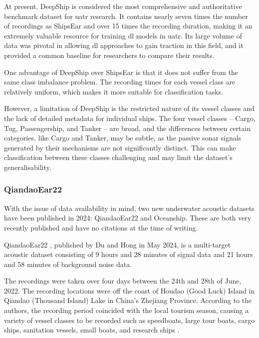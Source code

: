 At present, DeepShip is considered the most comprehensive and authoritative benchmark dataset for \acrshort{uatr} research. It contains nearly seven times the number of recordings as ShipsEar and over 15 times the recording duration, making it an extremely valuable resource for training \acrlong{dl} models in \acrshort{uatr}. Its large volume of data was pivotal in allowing \acrlong{dl} approaches to gain traction in this field, and it provided a common baseline for researchers to compare their results.

One advantage of DeepShip over ShipsEar is that it does not suffer from the same class imbalance problem. The recording times for each vessel class are relatively uniform, which makes it more suitable for classification tasks.

However, a limitation of DeepShip is the restricted nature of its vessel classes and the lack of detailed metadata for individual ships. The four vessel classes -- Cargo, Tug, Passengership, and Tanker -- are broad, and the differences between certain categories, like Cargo and Tanker, may be subtle, as the passive sonar signals generated by their mechanisms are not significantly distinct. This can make classification between these classes challenging and may limit the dataset's generalisability.

\subsubsection{QiandaoEar22}\label{subsubsec:qiandaoear22}

With the issue of data availability in mind, two new underwater acoustic datasets have been published in 2024: QiandaoEar22 and Oceanship. These are both very recently published and have no citations at the time of writing.

QiandaoEar22 \cite{du_qiandaoear22_2024}, published by Du and Hong in May 2024, is a multi-target acoustic dataset consisting of 9 hours and 28 minutes of signal data and 21 hours and 58 minutes of background noise data.

The recordings were taken over four days between the 24th and 28th of June, 2022. The recording locations were off the coast of Houdao (Good Luck) Island in Qiandao (Thousand Island) Lake in China's Zhejiang Province. According to the authors, the recording period coincided with the local tourism season, causing a variety of vessel classes to be recorded such as speedboats, large tour boats, cargo ships, sanitation vessels, small boats, and research ships \cite[5]{du_qiandaoear22_2024}.

